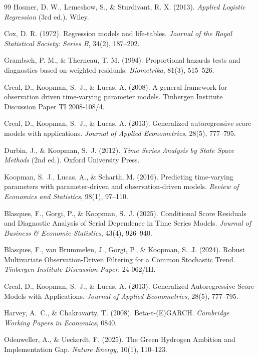 \begin{thebibliography}{99}
Hosmer, D. W., Lemeshow, S., \& Sturdivant, R. X. (2013).
\newblock \textit{Applied Logistic Regression} (3rd ed.). Wiley.

Cox, D. R. (1972).
\newblock Regression models and life-tables.
\newblock \textit{Journal of the Royal Statistical Society: Series B}, 34(2), 187--202.

Grambsch, P. M., \& Therneau, T. M. (1994).
\newblock Proportional hazards tests and diagnostics based on weighted residuals.
\newblock \textit{Biometrika}, 81(3), 515--526.


Creal, D., Koopman, S.~J., \& Lucas, A. (2008).
\newblock A general framework for observation driven time-varying parameter models.
\newblock Tinbergen Institute Discussion Paper TI 2008-108/4.

Creal, D., Koopman, S.~J., \& Lucas, A. (2013).
\newblock Generalized autoregressive score models with applications.
\newblock \textit{Journal of Applied Econometrics}, 28(5), 777--795.

Durbin, J., \& Koopman, S.~J. (2012).
\newblock \textit{Time Series Analysis by State Space Methods} (2nd ed.).
\newblock Oxford University Press.

Koopman, S.~J., Lucas, A., \& Scharth, M. (2016).
\newblock Predicting time-varying parameters with parameter-driven and observation-driven models.
\newblock \textit{Review of Economics and Statistics}, 98(1), 97--110.


Blasques, F., Gorgi, P., \& Koopman, S.~J. (2025).
\newblock Conditional Score Residuals and Diagnostic Analysis of Serial Dependence in Time Series Models.
\newblock \emph{Journal of Business \& Economic Statistics}, 43(4), 926--940.

Blasques, F., van Brummelen, J., Gorgi, P., \& Koopman, S.~J. (2024).
\newblock Robust Multivariate Observation-Driven Filtering for a Common Stochastic Trend.
\newblock \emph{Tinbergen Institute Discussion Paper}, 24-062/III.

Creal, D., Koopman, S.~J., \& Lucas, A. (2013).
\newblock Generalized Autoregressive Score Models with Applications.
\newblock \emph{Journal of Applied Econometrics}, 28(5), 777--795.



Harvey, A.~C., \& Chakravarty, T. (2008).
\newblock Beta-t-(E)GARCH.
\newblock \emph{Cambridge Working Papers in Economics}, 0840.

Odenweller, A., \& Ueckerdt, F. (2025).
\newblock The Green Hydrogen Ambition and Implementation Gap.
\newblock \emph{Nature Energy}, 10(1), 110--123.


\end{thebibliography}

